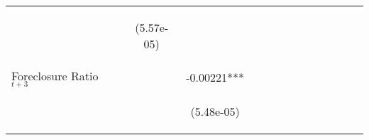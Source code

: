 \begin{table}
\begin{center}
{\begin{tabular}{lccccccccccccc}
\vspace{4pt} &  \begin{footnotesize}\end{footnotesize} & \begin{footnotesize}(5.57e-05)\end{footnotesize} & \begin{footnotesize}\end{footnotesize} & \begin{footnotesize}\end{footnotesize} & \begin{footnotesize}\end{footnotesize} & \begin{footnotesize}\end{footnotesize} & \begin{footnotesize}\end{footnotesize} & \begin{footnotesize}\end{footnotesize} & \begin{footnotesize}\end{footnotesize} & \begin{footnotesize}\end{footnotesize} & \begin{footnotesize}\end{footnotesize} & \begin{footnotesize}\end{footnotesize} \\
Foreclosure Ratio$_{t+3}$    &  &  & -0.00221*** &  &  &  &  &  &  &  &  &  \\
\vspace{4pt} &  \begin{footnotesize}\end{footnotesize} & \begin{footnotesize}\end{footnotesize} & \begin{footnotesize}(5.48e-05)\end{footnotesize} & \begin{footnotesize}\end{footnotesize} & \begin{footnotesize}\end{footnotesize} & \begin{footnotesize}\end{footnotesize} & \begin{footnotesize}\end{footnotesize} & \begin{footnotesize}\end{footnotesize} & \begin{footnotesize}\end{footnotesize} & \begin{footnotesize}\end{footnotesize} & \begin{footnotesize}\end{footnotesize} & \begin{footnotesize}\end{footnotesize} \\

\end{tabular}}
\end{center}
\end{table}
